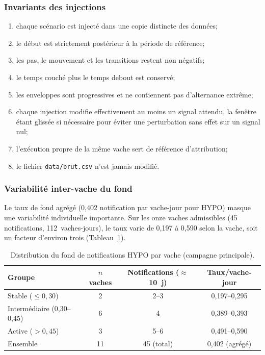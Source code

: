 \vspace{-0.5\baselineskip}
\subsubsection{Invariants des injections}
\begin{enumerate}[nosep]
  \item chaque scénario est injecté dans une copie distincte des données;
  \item le début est strictement postérieur à la période de référence;
  \item les pas, le mouvement et les transitions restent non négatifs;
  \item le temps couché plus le temps debout est conservé;
  \item les enveloppes sont progressives et ne contiennent pas d'alternance extrême;
  \item chaque injection modifie effectivement au moins un signal attendu, la fenêtre étant
  glissée si nécessaire pour éviter une perturbation sans effet sur un signal nul;
  \item l'exécution propre de la même vache sert de référence d'attribution;
  \item le fichier \texttt{data/brut.csv} n'est jamais modifié.
\end{enumerate}

\vspace{-0.75\baselineskip}
\subsubsection{Variabilité inter-vache du fond}
Le taux de fond agrégé (0,402 notification par vache-jour pour HYPO) masque une variabilité
individuelle importante. Sur les onze vaches admissibles (45 notifications, 112~vaches-jours),
le taux varie de 0,197 à 0,590 selon la vache, soit un facteur d'environ trois
(Tableau~\ref{tab:fond_par_vache}).

\begingroup
\setlength{\intextsep}{0.3\baselineskip}
\begin{table}[H]
  \centering
  \caption{Distribution du fond de notifications HYPO par vache (campagne principale).}
  \label{tab:fond_par_vache}
  \small
  \begin{tabular}{lccc}
    \toprule
    Groupe & $n$ vaches & Notifications ($\approx$10~j) & Taux/vache-jour \\
    \midrule
    Stable ($\leq 0{,}30$) & 2 & 2--3 & 0,197--0,295 \\
    Intermédiaire (0,30--0,45) & 6 & 4 & 0,389--0,393 \\
    Active ($> 0{,}45$) & 3 & 5--6 & 0,491--0,590 \\
    \midrule
    Ensemble & 11 & 45 (total) & 0,402 (agrégé) \\
    \bottomrule
  \end{tabular}
\end{table}
\endgroup

